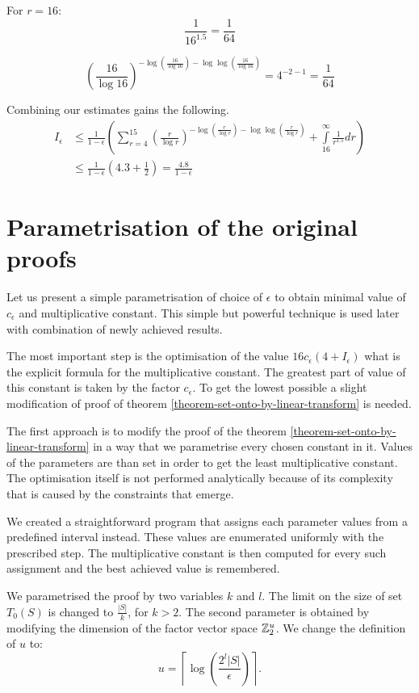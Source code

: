 For $r = 16$:
\[
	\frac{1}{16 ^ {1.5}} = \frac{1}{64}
\]

\[
	\left(\frac{16}{\log 16}\right)^{-\log \left(\frac{16}{\log 16}\right) - \log \log \left(\frac{16}{\log 16}\right)} = 4^{-2 - 1} = \frac{1}{64}
\]

Combining our estimates gains the following.
\[
\begin{split}
I_{\epsilon} 
	& \leq \frac{1}{1 - \epsilon} \left( \displaystyle \sum_{r = 4}^{15} \left(\frac{r}{\log r}\right)^{-\log \left(\frac{r}{\log r}\right) - \log \log \left(\frac{r}{\log r}\right)} + \int\limits_{16}^\infty \frac{1}{r^{1.5}} dr \right) \\
	& \leq \frac{1}{1 - \epsilon} \left(4.3 + \frac{1}{2}\right) = \frac{4.8}{1-\epsilon}
\end{split}
\]

\section{Parametrisation of the original proofs}
Let us present a simple parametrisation of choice of $\epsilon$ to obtain minimal value of $c_\epsilon$ and multiplicative constant. This simple but powerful technique is used later with combination of newly achieved results.

The most important step is the optimisation of the value $16 c_\epsilon (4 + I_{\epsilon})$ what is the explicit formula for the multiplicative constant. The greatest part of value of this constant is taken by the factor $c_\epsilon$. To get the lowest possible a slight modification of proof of theorem \ref{theorem-set-onto-by-linear-transform} is needed.

The first approach is to modify the proof of the theorem \ref{theorem-set-onto-by-linear-transform} in a way that we parametrise every chosen constant in it. Values of the parameters are than set in order to get the least multiplicative constant. The optimisation itself is not performed analytically because of its complexity that is caused by the constraints that emerge. 

We created a straightforward program that assigns each parameter values from a predefined interval instead. These values are enumerated uniformly with the prescribed step. The multiplicative constant is then computed for every such assignment and the best achieved value is remembered.

We parametrised the proof by two variables $k$ and $l$. The limit on the size of set $T_0(S)$ is changed to $\frac{|S|}{k}$, for $k > 2$. The second parameter is obtained by modifying the dimension of the factor vector space $\mathbb{Z}_{2}^{u}$. We change the definition of $u$ to:
\[
u = \left\lceil \log \left(\frac{2^l |S|}{\epsilon}\right) \right\rceil \text{.}
\]

